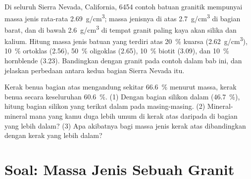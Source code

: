 \begin{exercise}[$\star\star\star$]\label{exo:g11:minerals:14}
Di seluruh Sierra Nevada, California, \num{6454} contoh batuan granitik
mempunyai massa jenis rata-rata \qty{2.69}{g/cm^3}; massa jenisnya di atas
\qty{2.7}{g/cm^3} di bagian barat, dan di bawah \qty{2.6}{g/cm^3} di tempat granit
paling kaya akan silika dan kalium. Hitung massa jenis batuan yang terdiri atas
\qty{20}{\percent} kuarsa
(\qty{2.62}{g/cm^3}), \qty{10}{\percent} ortoklas (\qty{2.56}{}),
\qty{50}{\percent} oligoklas (\qty{2.65}{}), \qty{10}{\percent} biotit
(\qty{3.09}{}), dan \qty{10}{\percent} hornblende (\qty{3.23}{}). Bandingkan
dengan granit pada contoh dalam bab ini, dan jelaskan perbedaan antara kedua
bagian Sierra Nevada itu.
\end{exercise}

\begin{exercise}[$\star\star\star$]\label{exo:g11:minerals:15}
Kerak benua bagian atas mengandung sekitar \qty{66.6}{\percent} 
menurut massa, kerak benua secara keseluruhan \qty{60.6}{\percent}. (1) Dengan
bagian silikon dalam  (\qty{46.7}{\percent}), hitung bagian silikon yang
terikat dalam  pada masing-masing. (2) Mineral-mineral mana yang kamu
duga lebih umum di kerak atas daripada di bagian yang lebih dalam? (3) Apa
akibatnya bagi massa jenis kerak atas dibandingkan dengan kerak yang lebih dalam?
\end{exercise}

\section{Soal: Massa Jenis Sebuah Granit}

